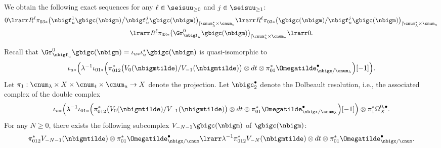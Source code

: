 \documentclass[a4,10pt]{article}
\begin{document}
\begin{lem}
\label{lem;23.3.29.12}
We obtain the following exact sequences
for any $\ell\in\seisuu_{\geq 0}$
and $j\in\seisuu_{\geq 1}$:
\begin{multline}
      0\lrarr
 R^{\ell}\pi_{03\ast}
 \bigl(
 \nbigf_u^1\gbigc(\nbigm)\big/
 \nbigf_u^j\gbigc(\nbigm)
 \bigr)
 _{|\cnum^{\ast}_{\lambda}\times\cnum_u}
 \lrarr
 R^{\ell}\pi_{03\ast}
 \bigl(
 \gbigc(\nbigm)/\nbigf_u^{j}\gbigc(\nbigm) \bigr)
 _{|\cnum^{\ast}_{\lambda}\times\cnum_u}
 \\
      \lrarr
 R^{\ell}\pi_{03\ast}\bigl(
 \Gr_{\nbigf_u}^0\gbigc(\nbigm)
 \bigr)
 _{|\cnum^{\ast}_{\lambda}\times\cnum_u}
\lrarr 0.
\end{multline}
\end{lem}
\pf
Recall that
$\Gr^0_{\nbigf_u}\gbigc(\nbigm)
=\iota_{u\ast}\iota_u^{\ast}\gbigc(\nbigm)$
is quasi-isomorphic to
\[
 \iota_{u\ast}\Bigl(
 \lambda^{-1}\iota_{01\ast}
 \Bigl(
 \pi_{012}^{\ast}
 \bigl(V_0(\nbigmtilde)/V_{-1}(\nbigmtilde)\bigr)
 \otimes dt\otimes
 \pi_{01}^{\ast}
 \Omegatilde^{\bullet}_{\nbigx/\cnum_{\lambda}}
 \Bigr)[-1]
 \Bigr).
\]
Let $\pi_1:\cnum_{\lambda}\times X\times\cnum_t\times\cnum_u\to X$
denote the projection.
Let $\nbigc_2^{\bullet}$
denote
the Dolbeault resolution,
i.e.,
the associated complex of the double complex
\[
  \iota_{u\ast}\Bigl(
 \lambda^{-1}\iota_{01\ast}
 \Bigl(
 \pi_{012}^{\ast}
 \bigl(V_0(\nbigmtilde)/V_{-1}(\nbigmtilde)\bigr)
 \otimes dt\otimes
 \pi_{01}^{\ast}
 \Omegatilde^{\bullet}_{\nbigx/\cnum_{\lambda}}
 \Bigr)[-1]
 \Bigr)
 \otimes
 \pi_1^{\ast}\Omega_X^{0,\bullet}.
\]
For any $N\geq 0$,
there exists the following subcomplex
$V_{-N-1}\gbigc(\nbigm)$ of $\gbigc(\nbigm)$:
\[
 \pi_{012}^{\ast}V_{-N-1}(\nbigmtilde)
 \otimes
 \pi_{01}^{\ast}\Omegatilde^{\bullet}_{\nbigx/\cnum}
 \lrarr
 \lambda^{-1}
 \pi_{012}^{\ast}V_{-N}(\nbigmtilde)
 \otimes dt\otimes
 \pi_{01}^{\ast}\Omegatilde^{\bullet}_{\nbigx/\cnum}.
\]
\end{document}
